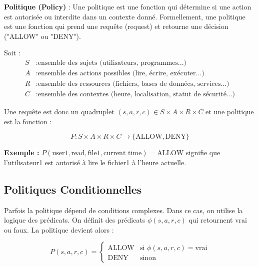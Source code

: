\documentclass[12pt,a4paper]{article}
\begin{document}
    \begin{definitionbox}
        \textbf{Politique (Policy)} : Une politique est une fonction qui détermine si une action est autorisée ou interdite dans un contexte donné. Formellement, une politique est une fonction qui prend une requête (request) et retourne une décision ("ALLOW" ou "DENY").
    \end{definitionbox}

    Soit :
    \begin{align}
        S &: \text{ensemble des sujets (utilisateurs, programmes...)} \\
        A &: \text{ensemble des actions possibles (lire, écrire, exécuter...)} \\
        R &: \text{ensemble des ressources (fichiers, bases de données, services...)} \\
        C &: \text{ensemble des contextes (heure, localisation, statut de sécurité...)}
    \end{align}

    Une requête est donc un quadruplet $(s,a,r,c) \in S \times A \times R \times C$ et une politique est la fonction :

    \begin{equation}
        P : S \times A \times R \times C \rightarrow \{\text{ALLOW}, \text{DENY}\}
    \end{equation}

    \textbf{Exemple :} $P(\text{user1}, \text{read}, \text{file1}, \text{current\_time}) = \text{ALLOW}$ signifie que l'utilisateur1 est autorisé à lire le fichier1 à l'heure actuelle.

    \subsection{Politiques Conditionnelles}

    Parfois la politique dépend de conditions complexes. Dans ce cas, on utilise la logique des prédicats. On définit des prédicats $\phi(s,a,r,c)$ qui retournent vrai ou faux. La politique devient alors :

    \begin{equation}
        P(s,a,r,c) = \begin{cases}
                         \text{ALLOW} & \text{si } \phi(s,a,r,c) = \text{vrai} \\
                         \text{DENY} & \text{sinon}
        \end{cases}
    \end{equation}
\end{document}
